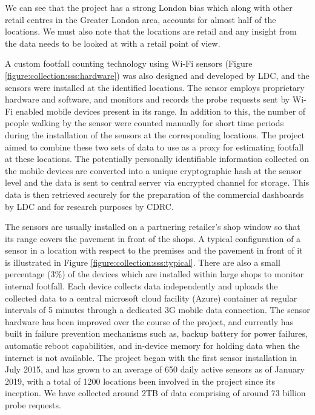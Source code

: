 We can see that the project has a strong London bias which along with other retail centres in the Greater London area, accounts for almost half of the locations.
We must also note that the locations are retail and any insight from the data needs to be looked at with a retail point of view.

A custom footfall counting technology using Wi-Fi sensors (Figure \ref{figure:collection:sss:hardware}) was also designed and developed by LDC, and the sensors were installed at the identified locations.
The sensor employs proprietary hardware and software, and monitors and records the probe requests sent by Wi-Fi enabled mobile devices present in its range.
In addition to this, the number of people walking by the sensor were counted manually for short time periods during the installation of the sensors at the corresponding locations.
The project aimed to combine these two sets of data to use as a proxy for estimating footfall at these locations.
The potentially personally identifiable information collected on the mobile devices are converted into a unique cryptographic hash at the sensor level and the data is sent to central server via encrypted channel for storage.
This data is then retrieved securely for the preparation of the commercial dashboards by LDC and for research purposes by CDRC.

The sensors are usually installed on a partnering retailer's shop window so that its range covers the pavement in front of the shops.
A typical configuration of a sensor in a location with respect to the premises and the pavement in front of it is illustrated in Figure \ref{figure:collection:sss:typical}.
There are also a small percentage (3\%) of the devices which are installed within large shops to monitor internal footfall.
Each device collects data independently and uploads the collected data to a central microsoft cloud facility (Azure) container at regular intervals of 5 minutes through a dedicated 3G mobile data connection.
The sensor hardware has been improved over the course of the project, and currently has built in failure prevention mechanisms such as, backup battery for power failures, automatic reboot capabilities, and in-device memory for holding data when the internet is not available.
The project began with the first sensor installation in July 2015, and has grown to an average of 650 daily active sensors as of January 2019, with a total of 1200 locations been involved in the project since its inception.
We have collected around 2TB of data comprising of around 73 billion probe requests.

